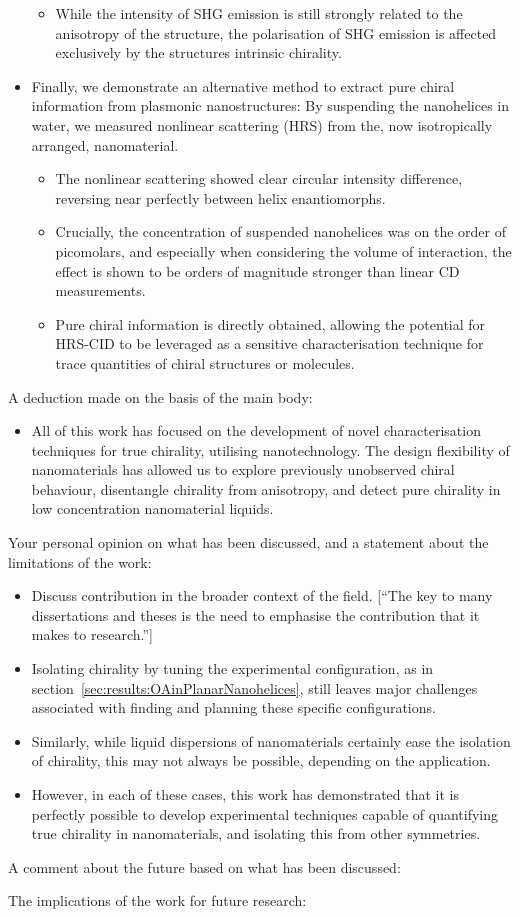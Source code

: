 \begin{itemize}
\begin{itemize}
        \item While the intensity of SHG emission is still strongly related to the anisotropy of the structure, the polarisation of SHG emission is affected exclusively by the structures intrinsic chirality.
    \end{itemize}
    \item Finally, we demonstrate an alternative method to extract pure chiral information from plasmonic nanostructures: By suspending the nanohelices in water, we measured nonlinear scattering (HRS) from the, now isotropically arranged, nanomaterial.
    \begin{itemize}
        \item The nonlinear scattering showed clear circular intensity difference, reversing near perfectly between helix enantiomorphs.
        \item Crucially, the concentration of suspended nanohelices was on the order of picomolars, and especially when considering the volume of interaction, the effect is shown to be orders of magnitude stronger than linear CD measurements.
        \item Pure chiral information is directly obtained, allowing the potential for HRS-CID to be leveraged as a sensitive characterisation technique for trace quantities of chiral structures or molecules.
    \end{itemize}
\end{itemize}

A deduction made on the basis of the main body:
\begin{itemize}
    \item All of this work has focused on the development of novel characterisation techniques for true chirality, utilising nanotechnology. The design flexibility of nanomaterials has allowed us to explore previously unobserved chiral behaviour, disentangle chirality from anisotropy, and detect pure chirality in low concentration nanomaterial liquids.
\end{itemize}

Your personal opinion on what has been discussed, and a statement about the limitations of the work:
\begin{itemize}
    \item Discuss contribution in the broader context of the field. [``The key to many dissertations and theses is the need to emphasise the contribution that it makes to research.'']
    \item Isolating chirality by tuning the experimental configuration, as in section~\ref{sec:results:OAinPlanarNanohelices}, still leaves major challenges associated with finding and planning these specific configurations.
    \item Similarly, while liquid dispersions of nanomaterials certainly ease the isolation of chirality, this may not always be possible, depending on the application.
    \item However, in each of these cases, this work has demonstrated that it is perfectly possible to develop experimental techniques capable of quantifying true chirality in nanomaterials, and isolating this from other symmetries.
\end{itemize}

A comment about the future based on what has been discussed:


The implications of the work for future research:


\color{black}